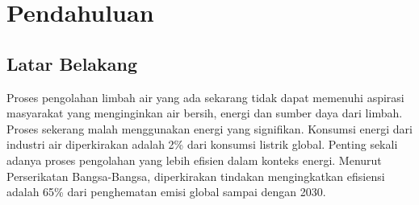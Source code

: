 \documentclass[10pt,a4paper,hidelinks]{article}
\begin{document}
    \pagestyle{plain}
    \title{\rmfamily\normalfont{}}
    \author{}
    \date{} %
    
    \maketitle
    
    \begin{abstract}
    	\noindent Proses pengolahan limbah air sekarang meninggalkan banyak ruang untuk dikembangkan dan ditingkatkan. Limbah dapat menjadi sumber energi yang berharga --- sekitar 9 kali lebih banyak energi terkandung dalam limbah dibandingkan dengan energi yang diperlukan untuk mengolahnya dengan cara modern. Proses-proses yang tersedia sekerang jarang mempertimbangkan dan menggunakan hal ini, proses-proses ini juga sering tidak efisien dan 'kotor'.
Menggabungkan teknologi-teknologi pengolahan limbah menjadi sebuah proses hibrida berpusat pada Microbial Fuel Cell (MFC) dapat memecahkan masalah ini. Keuntungan yang didapat dalam menggunakan proses hibrida ini diantara lain adalah berikut: ekstraksi sumber daya, ekstraksi energi (listrik) yang lebih besar dan efisien dan pembersihan limbah yang lebih bersih.
    \end{abstract}
       
    \tableofcontents
    \section{Pendahuluan}
    \subsection{Latar Belakang}
    Proses pengolahan limbah air yang ada sekarang tidak dapat memenuhi aspirasi masyarakat yang menginginkan air bersih, energi dan sumber daya dari limbah. Proses sekerang malah menggunakan energi yang signifikan. Konsumsi energi dari industri air diperkirakan adalah 2\% dari konsumsi listrik global. Penting sekali adanya proses pengolahan yang lebih efisien dalam konteks energi. Menurut Perserikatan Bangsa-Bangsa, diperkirakan tindakan mengingkatkan efisiensi adalah 65\% dari penghematan emisi global sampai dengan 2030.
    
\end{document}
